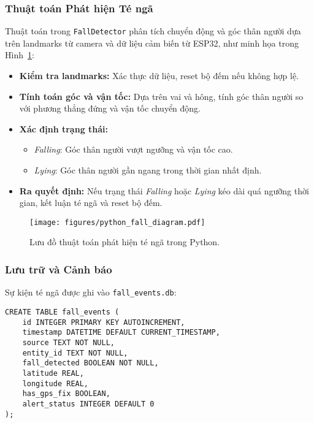 \subsubsection{Thuật toán Phát hiện Té ngã}
\label{subsubsec:fall_detection_algorithm}

Thuật toán trong \texttt{FallDetector} phân tích chuyển động và góc thân người dựa trên landmarks từ camera và dữ liệu cảm biến từ ESP32, như minh họa trong Hình~\ref{fig:python_fall_diagram}:
\begin{itemize}
    \item \textbf{Kiểm tra landmarks:} Xác thực dữ liệu, reset bộ đếm nếu không hợp lệ.
    \item \textbf{Tính toán góc và vận tốc:} Dựa trên vai và hông, tính góc thân người so với phương thẳng đứng và vận tốc chuyển động.
    \item \textbf{Xác định trạng thái:}
    \begin{itemize}
        \item \textit{Falling}: Góc thân người vượt ngưỡng và vận tốc cao.
        \item \textit{Lying}: Góc thân người gần ngang trong thời gian nhất định.
    \end{itemize}
    \item \textbf{Ra quyết định:} Nếu trạng thái \textit{Falling} hoặc \textit{Lying} kéo dài quá ngưỡng thời gian, kết luận té ngã và reset bộ đếm.
\end{itemize}

\begin{figure}[H]
\centering
\texttt{[image: figures/python\_fall\_diagram.pdf]}
\caption{Lưu đồ thuật toán phát hiện té ngã trong Python.}
\label{fig:python_fall_diagram}
\end{figure}

\subsubsection{Lưu trữ và Cảnh báo}
\label{subsubsec:data_storage_alerts}

Sự kiện té ngã được ghi vào \texttt{fall\_events.db}:

\begin{verbatim}
CREATE TABLE fall_events (
    id INTEGER PRIMARY KEY AUTOINCREMENT,
    timestamp DATETIME DEFAULT CURRENT_TIMESTAMP,
    source TEXT NOT NULL,
    entity_id TEXT NOT NULL,
    fall_detected BOOLEAN NOT NULL,
    latitude REAL,
    longitude REAL,
    has_gps_fix BOOLEAN,
    alert_status INTEGER DEFAULT 0
);
\end{verbatim}
